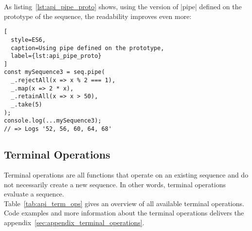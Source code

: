 As listing~\ref{lst:api_pipe_proto} shows, using the version of |pipe| defined
on the prototype of the sequence, the readability improves even more:
\begin{lstlisting}[
  style=ES6,
  caption=Using pipe defined on the prototype,
  label={lst:api_pipe_proto}
]
const mySequence3 = seq.pipe(
  _.rejectAll(x => x % 2 === 1),
  _.map(x => 2 * x),
  _.retainAll(x => x > 50),
  _.take(5)
);
console.log(...mySequence3);
// => Logs '52, 56, 60, 64, 68'
\end{lstlisting}


\subsection{Terminal Operations} %
\label{sub:api_Terminal Operations}
Terminal operations are all functions that operate on an existing sequence
and do not necessarily create a new sequence. In other words, terminal
operations evaluate a sequence.\\ 
Table~\ref{tab:api_term_ops} gives an overview of all available terminal
operations.\\
Code examples and more information about the terminal operations delivers the
appendix~\ref{sec:appendix_terminal_operations}.

